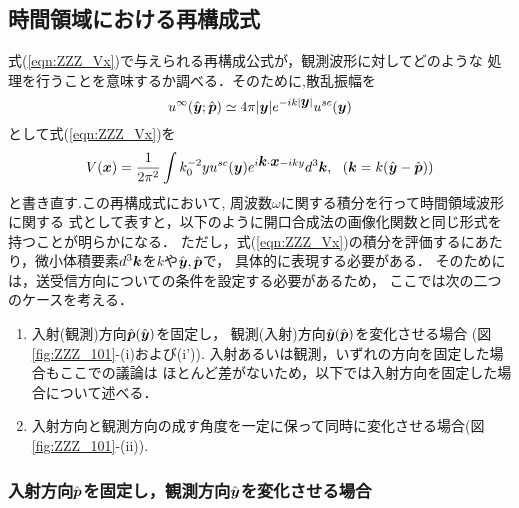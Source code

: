 \subsection{時間領域における再構成式}
式(\ref{eqn:ZZZ_Vx})で与えられる再構成公式が，観測波形に対してどのような
処理を行うことを意味するか調べる．そのために,散乱振幅を
\begin{equation}
	u^{\infty}(\hat{\mbox{\boldmath $y$}};\hat{\mbox{\boldmath $p$}}) 
	\simeq 
	4\pi |\mbox{\boldmath $y$}|e^{-ik|\mbox{\boldmath $y$}|} u^{sc}(\mbox{\boldmath $y$})
	\label{eqn:ZZZ_21}
\end{equation}
として式(\ref{eqn:ZZZ_Vx})を
\begin{equation}
	V(\mbox{\boldmath $x$}) =\frac{1}{2\pi^2} \int k_0^{-2} yu^{sc}(\mbox{\boldmath $y$})
	e^{i\mbox{\boldmath $k$}\cdot \mbox{\boldmath $x$}-iky}d^3\mbox{\boldmath $k$}, 
	\ \ (\mbox{\boldmath $k$}=k(\hat{\mbox{\boldmath $y$}}-\hat{\mbox{\boldmath $p$}}))
	\label{eqn:ZZZ_Vx_usc}
\end{equation}
と書き直す.この再構成式において, 周波数$\omega$に関する積分を行って時間領域波形に関する
式として表すと，以下のように開口合成法の画像化関数と同じ形式を持つことが明らかになる．
ただし，式(\ref{eqn:ZZZ_Vx})の積分を評価するにあたり，微小体積要素$d^3\mbox{\boldmath $k$}$を$k$や$\hat{\mbox{\boldmath $y$}},\hat{\mbox{\boldmath $p$}}$で，
具体的に表現する必要がある． そのためには，送受信方向についての条件を設定する必要があるため，
ここでは次の二つのケースを考える． 
\begin{enumerate}
\item
	入射(観測)方向$\hat{\mbox{\boldmath $p$}}(\hat{\mbox{\boldmath $y$}})$を固定し，
	観測(入射)方向$\hat{\mbox{\boldmath $y$}}(\hat{\mbox{\boldmath $p$}})$を変化させる場合
		(図\ref{fig:ZZZ_101}-(i)および(i')).
	入射あるいは観測，いずれの方向を固定した場合もここでの議論は
	ほとんど差がないため，以下では入射方向を固定した場合について述べる．
\item
	入射方向と観測方向の成す角度を一定に保って同時に変化させる場合(図\ref{fig:ZZZ_101}-(ii)).
\end{enumerate}
\subsubsection{
	入射方向$\hat{\mbox{\boldmath $p$}}$を固定し，観測方向$\hat{\mbox{\boldmath $y$}}$を変化させる場合
}

